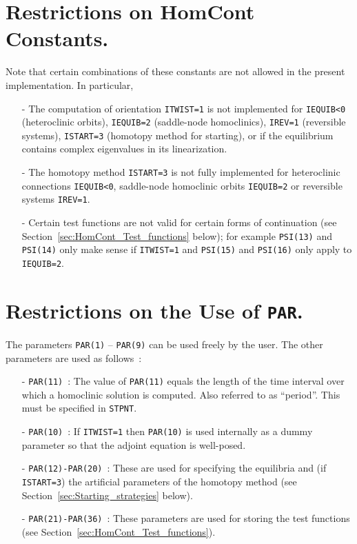 \documentclass[12pt]{report}
\begin{document}
\section{ Restrictions on {\cal HomCont} Constants.}
Note that certain combinations of these constants are not allowed
in the present implementation. In particular,
\begin{itemize}
\item[-] 
The computation of orientation {\tt ITWIST=1} is not
implemented for {\tt IEQUIB<0} (heteroclinic orbits), 
{\tt IEQUIB=2} (saddle-node homoclinics),
{\tt IREV=1} (reversible systems), {\tt ISTART=3} (homotopy
method for starting), or if the equilibrium contains complex
eigenvalues in its linearization.  
\item[-] The homotopy method {\tt ISTART=3} is not fully implemented
for heteroclinic connections {\tt IEQUIB<0}, saddle-node homoclinic
orbits {\tt IEQUIB=2} or reversible systems {\tt IREV=1}.
\item[-] Certain test functions are not valid for certain forms
of continuation 
(see Section~\ref{sec:HomCont_Test_functions} below); 
for example
{\tt PSI(13)} and {\tt PSI(14)} only make sense if 
{\tt ITWIST=1} and {\tt PSI(15)} and {\tt PSI(16)} only apply
to {\tt IEQUIB=2}.
\end{itemize}

\section{ Restrictions on the Use of {\tt PAR}.}
The parameters {\tt PAR(1)} -- {\tt PAR(9)} can be used freely by
the user. The other parameters are used as follows~:

\begin{itemize}

\item[-] {\tt PAR(11)}~: 
The value of {\tt PAR(11)} equals the length of the time interval over
which a homoclinic solution is computed. Also referred to as ``period''.
This must be specified in {\tt STPNT}.

\item[-] {\tt PAR(10)}~: 
If {\tt ITWIST=1} then {\tt PAR(10)} is used internally as a
dummy parameter so that the adjoint equation is well-posed.

\item[-] {\tt PAR(12)-PAR(20)}~:
These are used for specifying the 
equilibria and (if {\tt ISTART=3}) the artificial parameters of
the homotopy method (see Section~\ref{sec:Starting_strategies} below).

\item[-] {\tt PAR(21)-PAR(36)}~: 
These parameters are used for storing the test functions 
(see Section~\ref{sec:HomCont_Test_functions}).
\end{itemize}
\end{document}
